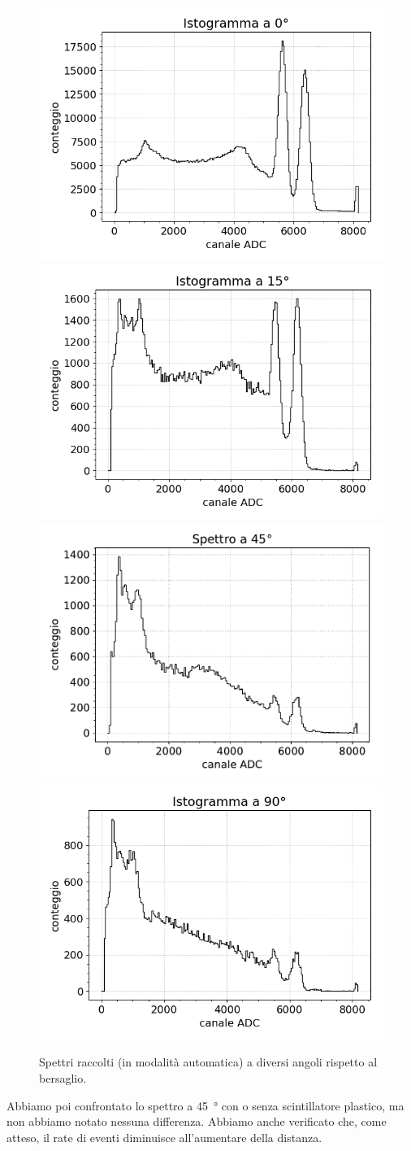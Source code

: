 \begin{figure}[h]
\centering

\subfloat
{\includegraphics[width= 16 em]{0g}} \qquad
\subfloat
{\includegraphics[width= 16 em]{15g}} \\

\subfloat
{\includegraphics[width= 16 em]{45g}} \qquad
\subfloat
{\includegraphics[width= 16 em]{90g}}

\caption{Spettri raccolti (in modalità automatica) a diversi angoli rispetto al bersaglio.}
\label{4ang}
\end{figure}

Abbiamo poi confrontato lo spettro a \SI{45}{\degree} con o senza scintillatore plastico, ma non abbiamo notato nessuna differenza. Abbiamo anche verificato che, come atteso, il rate di eventi diminuisce all'aumentare della distanza.

